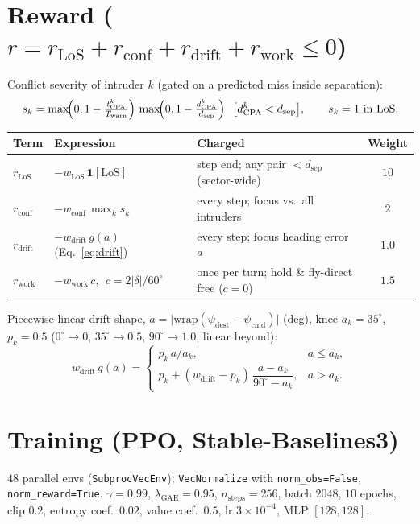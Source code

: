 \documentclass[11pt, a4paper]{article}
\begin{document}
\section{Reward ($r=r_\text{LoS}+r_\text{conf}+r_\text{drift}+r_\text{work}\le 0$)}
Conflict severity of intruder $k$ (gated on a predicted miss inside separation):
\begin{equation}
s_k=\max\!\Bigl(0,1-\tfrac{t_\text{CPA}^k}{T_\text{warn}}\Bigr)\,
     \max\!\Bigl(0,1-\tfrac{d_\text{CPA}^k}{d_\text{sep}}\Bigr)\ \ \bigl[d_\text{CPA}^k<d_\text{sep}\bigr],
\qquad s_k=1\ \text{in LoS.}
\label{eq:score}
\end{equation}
\begin{table}[h]\centering
\begin{tabular}{lllc}
\toprule
Term & Expression & Charged & Weight\\
\midrule
$r_\text{LoS}$  & $-w_\text{LoS}\,\mathbf 1[\text{LoS}]$              & step end; any pair $<d_\text{sep}$ (sector-wide) & $10$\\
$r_\text{conf}$ & $-w_\text{conf}\,\max_k s_k$                        & every step; focus vs.\ all intruders             & $2$\\
$r_\text{drift}$& $-w_\text{drift}\,g(a)$ \;(Eq.~\ref{eq:drift})      & every step; focus heading error $a$              & $1.0$\\
$r_\text{work}$ & $-w_\text{work}\,c,\ \ c=2|\delta|/60^\circ$        & once per turn; hold \& fly-direct free ($c{=}0$) & $1.5$\\
\bottomrule
\end{tabular}
\end{table}

Piecewise-linear drift shape, $a=\bigl|\mathrm{wrap}(\psi_\text{dest}-\psi_\text{cmd})\bigr|$ (deg),
knee $a_k=35^\circ$, $p_k=0.5$ \;($0^\circ\!\to\!0$, $35^\circ\!\to\!0.5$, $90^\circ\!\to\!1.0$, linear beyond):
\begin{equation}
w_\text{drift}\,g(a)=
\begin{cases}
p_k\,a/a_k, & a\le a_k,\\[1mm]
p_k+(w_\text{drift}-p_k)\,\dfrac{a-a_k}{90^\circ-a_k}, & a> a_k.
\end{cases}
\label{eq:drift}
\end{equation}

\section{Training (PPO, Stable-Baselines3)}
$48$ parallel envs (\texttt{SubprocVecEnv}); \texttt{VecNormalize} with
\texttt{norm\_obs=False}, \texttt{norm\_reward=True}.
$\gamma=0.99$, $\lambda_\text{GAE}=0.95$, $n_\text{steps}=256$, batch $2048$, $10$ epochs,
clip $0.2$, entropy coef.\ $0.02$, value coef.\ $0.5$, lr $3\times10^{-4}$, MLP $[128,128]$.
\end{document}
